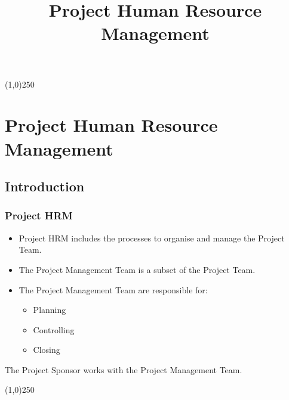 



%
\title[Project Management \& BIM]{Project Human Resource Management}



%
\usetikzlibrary{arrows}

\tableofcontents
\newpage



\begin{frame}
\titlepage
\end{frame}\begin{center}\line(1,0){250}\end{center}
%
%


\section{Project Human Resource Management}

\subsection{Introduction}



\begin{frame}
\frametitle{Project HRM}
\begin{itemize}
	\item Project HRM includes the processes to organise and manage the Project Team.
	\item The Project Management Team is a subset of the Project Team.
	\item The Project Management Team are responsible for:
		\begin{itemize}
			\item Planning
			\item Controlling
			\item Closing
		\end{itemize}
\end{itemize}
The Project Sponsor works with the Project Management Team.
\end{frame}\begin{center}\line(1,0){250}\end{center}
 
